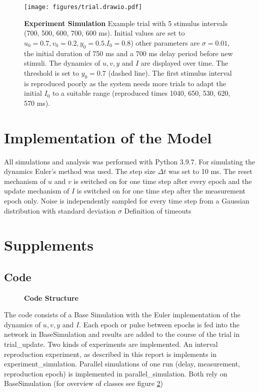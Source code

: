 \documentclass[9pt]{article}
\begin{document}
\begin{figure}[ht]
	\centering
	\texttt{[image: figures/trial.drawio.pdf]}
	\caption{\textbf{Experiment Simulation} Example trial with 5 stimulus intervals (700, 500, 600, 700, 600 ms). Initial values are set to $u_0=0.7 , v_0=0.2 , y_0=0.5. I_0=0.8$) other parameters are $\sigma=0.01$, the initial duration of 750 ms and a 700 ms delay period before new stimuli. The dynamics of $u, v, y $ and $I$ are displayed over time. The threshold is set to $y_0=0.7$ (dashed line). The first stimulus interval is reproduced poorly as the system needs more trials to adapt the initial $I_0$ to a suitable range (reproduced times 1040, 650, 530, 620, 570 ms).}
\label{fig:trial}
\end{figure}


\section{Implementation of the Model}
All simulations and analysis was performed with Python 3.9.7. 
For simulating the dynamics Euler's method was used. The step size $\Delta t$ was set to 10 ms.
The reset mechanism of $u$ and $v$ is switched on for one time step after every epoch and the update mechanism of $I$ is switched on for one time step after the measurement epoch only. 
Noise is independently sampled for every time step from a Gaussian distribution with standard deviation $\sigma$
Definition of timeouts


\section{Supplements}

\subsection{Code}
\begin{figure}[ht]
	\caption{\textbf{Code Structure}}
\label{fig:code}
\end{figure}

The code consists of a Base Simulation with the Euler implementation of the dynamics of $u, v, y$ and $I$. Each epoch or pulse between epochs is fed into the network in BaseSimulation and results are added to the course of the trial in trial\_update. 
Two kinds of experiments are implemented. An interval reproduction experiment, as described in this report is implements in experiment\_simulation. 
Parallel simulations of one run (delay, measurement, reproduction epoch) is implemented in parallel\_simulation. Both rely on BaseSimulation (for overview of classes see figure \ref{fig:code})



\printbibliography
\end{document}
